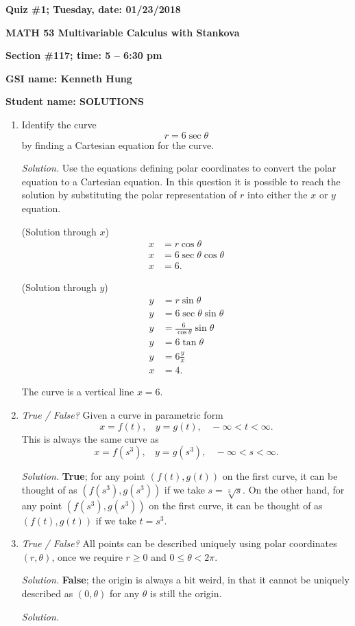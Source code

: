 \documentclass{article}
\begin{document}
{\bf Quiz \#1; Tuesday, date: 01/23/2018}

{\bf MATH 53 Multivariable Calculus with Stankova}

{\bf Section \#117; time: 5 -- 6:30 pm}

{\bf GSI name: Kenneth Hung}

{\bf Student name: SOLUTIONS}

\vspace*{0.25in}

\begin{enumerate}
\item Identify the curve
\[
r = 6 \sec \theta
\]
by finding a Cartesian equation for the curve.

\vspace*{0.25in}

{\em Solution.} Use the equations defining polar coordinates to convert the polar equation to a Cartesian equation. In this question it is possible to reach the solution by substituting the polar representation of $r$ into either the $x$ or $y$ equation.

(Solution through $x$)
\begin{align*}
x & = r \cos \theta \\
x & = 6 \sec \theta \cos \theta \\
x & = 6.
\end{align*}

(Solution through $y$)
\begin{align*}
y & = r \sin \theta \\
y & = 6 \sec \theta \sin \theta \\
y & = \frac{6}{\cos \theta} \sin \theta \\
y & = 6 \tan \theta \\
y & = 6 \frac{y}{x} \\
x & = 4.
\end{align*}

The curve is a vertical line $x = 6$.

\item {\em True / False?} Given a curve in parametric form
\[
x = f(t), ~~~~ y = g(t), ~~~~ -\infty < t < \infty.
\]
This is always the same curve as
\[
x = f(s^3), ~~~~ y = g(s^3), ~~~~ -\infty < s < \infty.
\]

{\em Solution.} {\bf True}; for any point $(f(t), g(t))$ on the first curve, it can be thought of as $(f(s^3), g(s^3))$ if we take $s = \sqrt[3]{s}$. On the other hand, for any point $(f(s^3), g(s^3))$ on the first curve, it can be thought of as $(f(t), g(t))$ if we take $t = s^3$.

\item {\em True / False?} All points can be described uniquely using polar coordinates $(r, \theta)$, once we require $r \ge 0$ and $0 \le \theta < 2\pi$.

{\em Solution.} {\bf False}; the origin is always a bit weird, in that it cannot be uniquely described as $(0, \theta)$ for any $\theta$ is still the origin.

{\em Solution.}
\end{enumerate}
\end{document}
